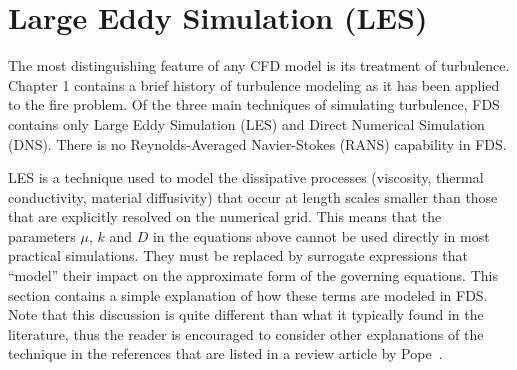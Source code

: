 \section{Large Eddy Simulation (LES)}
\label{LES}

The most distinguishing feature of any CFD model is its treatment of turbulence.
Chapter 1 contains a brief history of turbulence modeling as it has been applied to the fire
problem. Of the three main techniques of simulating turbulence, FDS contains only Large Eddy
Simulation (LES) and Direct Numerical Simulation (DNS). There is no Reynolds-Averaged Navier-Stokes (RANS)
capability in FDS.

LES is a technique used to model the dissipative processes (viscosity,
thermal conductivity, material diffusivity) that occur at length scales smaller than those that
are explicitly resolved on the numerical grid. This means that the parameters $\mu$, $k$ and $D$ in the equations
above cannot be used directly in most practical simulations. They must be replaced by surrogate expressions
that ``model'' their impact on the approximate form of the governing equations.
This section contains a simple explanation of how these terms are modeled
in FDS. Note that this discussion is quite different than what it typically found in the
literature, thus the reader is encouraged to consider other explanations of the technique in the references that are
listed in a review article by Pope~\cite{Pope:2004}.

